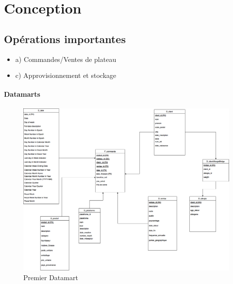 \section{Conception}
    \subsection{Opérations importantes}
    \begin{itemize}
        \item a) Commandes/Ventes de plateau
        \item c) Approvisionnement et stockage
    \end{itemize}


\paragraph{Datamarts} 
    \begin{figure}[h]
        \centerline{\includegraphics[scale=0.4]{EtoileDM1.png}}
        \caption{Premier Datamart}
        \label{fig:UML}
    \end{figure}
    
